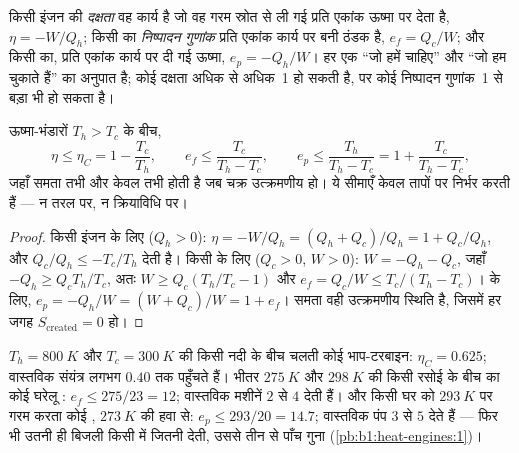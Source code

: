 \begin{definition}[दक्षता और निष्पादन गुणांक]\label{def:b1:heat-engines:efficiency}
किसी इंजन की \emph{दक्षता} वह कार्य है जो वह गरम स्रोत से ली गई प्रति एकांक
ऊष्मा पर देता है, $\eta = -W/Q_h$; किसी  का
\emph{निष्पादन गुणांक} प्रति एकांक कार्य पर बनी ठंडक है, $e_f = Q_c/W$; और
किसी  का, प्रति एकांक कार्य पर दी गई ऊष्मा, $e_p = -Q_h/W$। हर एक
``जो हमें चाहिए'' और ``जो हम चुकाते हैं'' का अनुपात है; कोई दक्षता अधिक से
अधिक~1 हो सकती है, पर कोई निष्पादन गुणांक~1 से बड़ा भी हो सकता है।
\end{definition}

\begin{theorem}[कार्नो]\label{thm:b1:heat-engines:carnot}
ऊष्मा-भंडारों $T_h > T_c$ के बीच,
\[
\eta \leq \eta_C = 1 - \frac{T_c}{T_h}, \qquad
e_f \leq \frac{T_c}{T_h - T_c}, \qquad
e_p \leq \frac{T_h}{T_h - T_c} = 1 + \frac{T_c}{T_h - T_c},
\]
जहाँ समता तभी और केवल तभी होती है जब चक्र उत्क्रमणीय हो। ये सीमाएँ केवल
तापों पर निर्भर करती हैं --- न तरल पर, न क्रियाविधि पर।
\end{theorem}

\begin{proof}
किसी इंजन के लिए ($Q_h > 0$): $\eta = -W/Q_h = (Q_h + Q_c)/Q_h = 1 + Q_c/Q_h$,
और  $Q_c/Q_h \leq -T_c/T_h$ देती है। किसी
 के लिए ($Q_c > 0$, $W > 0$): $W = -Q_h - Q_c$, जहाँ $-Q_h \geq Q_c T_h/T_c$,
अतः $W \geq Q_c(T_h/T_c - 1)$ और $e_f = Q_c/W \leq T_c/(T_h - T_c)$।
 के लिए, $e_p = -Q_h/W = (W + Q_c)/W = 1 + e_f$। समता वही
उत्क्रमणीय स्थिति है, जिसमें हर जगह $S_{\mathrm{created}} = 0$ हो।
\end{proof}

\begin{example}[तीन आँकड़े]\label{ex:b1:heat-engines:numbers}
$T_h = \qty{800}{K}$ और $T_c = \qty{300}{K}$ की किसी नदी के बीच चलती कोई
भाप-टरबाइन: $\eta_C = 0.625$; वास्तविक संयंत्र लगभग $0.40$ तक पहुँचते हैं।
भीतर $\qty{275}{K}$ और $\qty{298}{K}$ की किसी रसोई के बीच का कोई घरेलू
: $e_f \leq 275/23 = 12$; वास्तविक मशीनें $2$ से $4$ देती हैं। और
किसी घर को $\qty{293}{K}$ पर गरम करता कोई , $\qty{273}{K}$ की हवा
से: $e_p \leq 293/20 = 14.7$; वास्तविक पंप $3$ से $5$ देते हैं --- फिर भी
उतनी ही बिजली किसी  में जितनी देती, उससे तीन से पाँच गुना
(\cref{pb:b1:heat-engines:1})।
\end{example}

